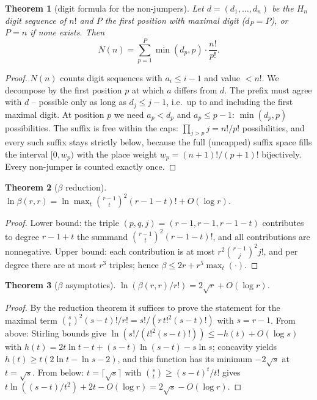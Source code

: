\documentclass[11pt]{article}
\newtheorem{satz}{Theorem}[section]
\theoremstyle{definition}
\theoremstyle{remark}
\begin{document}
\begin{satz}[digit formula for the non-jumpers]
Let $d=(d_1,\ldots,d_n)$ be the $H_n$ digit sequence of $n!$ and
$P$ the first position with maximal digit ($d_P=P$), or $P=n$
if none exists. Then
\[
N(n)=\sum_{p=1}^{P}\min(d_p,p)\cdot\frac{n!}{p!}.
\]
\end{satz}

\begin{proof}
$N(n)$ counts digit sequences with $a_i\le i-1$ and value $<n!$.
We decompose by the first position $p$ at which $a$ differs from
$d$. The prefix must agree with $d$ -- possible only as long as
$d_j\le j-1$, i.e.\ up to and including the first maximal digit.
At position $p$ we need $a_p<d_p$ and $a_p\le p-1$:
$\min(d_p,p)$ possibilities. The suffix is free within the caps:
$\prod_{j>p}j=n!/p!$ possibilities, and every such suffix stays
strictly below, because the full (uncapped) suffix space fills
the interval $[0,w_p)$ with the place weight
$w_p=(n{+}1)!/(p{+}1)!$ bijectively. Every non-jumper is counted
exactly once.
\end{proof}


\begin{satz}[$\beta$ reduction]
$\ln\beta(r,r)=\ln\max_{t}\binom{r-1}{t}^2(r{-}1{-}t)!+O(\log r)$.
\end{satz}

\begin{proof}
Lower bound: the triple $(p,q,j)=(r{-}1,r{-}1,r{-}1{-}t)$
contributes to degree $r{-}1{+}t$ the summand
$\binom{r-1}{t}^2(r{-}1{-}t)!$, and all contributions are
nonnegative. Upper bound: each contribution is at most
$r^2\binom{r-1}{j}^2j!$, and per degree there are at most $r^3$
triples; hence $\beta\le2r+r^5\max_t(\cdot)$.
\end{proof}


\begin{satz}[$\beta$ asymptotics]
$\ln(\beta(r,r)/r!)=2\sqrt r+O(\log r)$.
\end{satz}

\begin{proof}
By the reduction theorem it suffices to prove the statement for
the maximal term
$\binom st^2(s-t)!/r!=s!/(r\,t!^2(s-t)!)$ with $s=r-1$. From
above: Stirling bounds give
$\ln(s!/(t!^2(s-t)!))\le-h(t)+O(\log s)$
with $h(t)=2t\ln t-t+(s{-}t)\ln(s{-}t)-s\ln s$; concavity yields
$h(t)\ge t(2\ln t-\ln s-2)$, and this function has its minimum
$-2\sqrt s$ at $t=\sqrt s$. From below: $t=\lceil\sqrt s\rceil$
with $\binom st\ge(s-t)^t/t!$ gives
$t\ln((s-t)/t^2)+2t-O(\log r)=2\sqrt s-O(\log r)$.
\end{proof}
\end{document}
